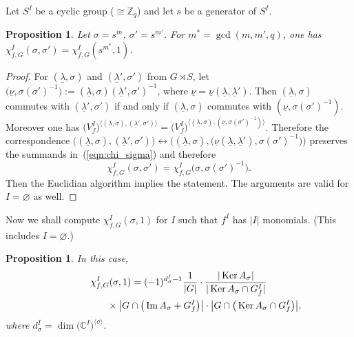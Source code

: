 \documentclass[pdftex]{sigma}
\numberwithin{equation}{section}
\newtheorem{Proposition}[Theorem]{Proposition}
 { \theoremstyle{definition}
\newtheorem{Definition}[Theorem]{Definition}
\newtheorem{Remark}[Theorem]{Remark} }
\begin{document}
Let $S^I$ be a cyclic group ($\cong {\mathbb Z}_q$) and let $s$ be a generator of $S^I$.

\begin{Proposition} \label{prop:red}
 Let $\sigma=s^m$, $\sigma'=s^{m'}$. For $m^*=\gcd(m, m', q)$, one has
 $\chi_{f,G}^I(\sigma, \sigma')=\chi_{f,G}^I(s^{m^*}, 1)$.
\end{Proposition}

\begin{proof}
 For $(\underline{\lambda},\sigma)$ and $(\underline{\lambda}',\sigma')$ from $G \rtimes S$, let
 $\big(\underline{\nu},\sigma(\sigma')^{-1}\big):=(\underline{\lambda},\sigma)(\underline{\lambda}',\sigma')^{-1}$,
 where $\underline{\nu}=\underline{\nu}(\underline{\lambda},\underline{\lambda}')$. Then
 $(\underline{\lambda},\sigma)$ commutes with $(\underline{\lambda}',\sigma')$ if and only if
 $(\underline{\lambda},\sigma)$ commutes with $(\underline{\nu},\sigma(\sigma')^{-1})$.
 Moreover one has
 $\big(V_f^I\big)^{\langle(\underline{\lambda},\sigma),(\underline{\lambda}',\sigma')\rangle}=
 \big(V_f^I\big)^{\langle(\underline{\lambda},\sigma),(\underline{\nu},\sigma(\sigma')^{-1})\rangle}$.
 Therefore the correspondence
 $\big((\underline{\lambda},\sigma),(\underline{\lambda}',\sigma')\big)\longleftrightarrow
 \big((\underline{\lambda},\sigma),
 \big(\underline{\nu}(\underline{\lambda},\underline{\lambda}'),\sigma(\sigma')^{-1}\big)\big)
 $
 preserves the summands in~(\ref{eqn:chi_sigma}) and therefore
 \[
 \chi_{f,G}^I(\sigma,\sigma')=\chi_{f,G}^I\big(\sigma,\sigma(\sigma')^{-1}\big).
 \]
Then the Euclidian algorithm implies the statement. The arguments are valid for $I=\varnothing$ as well.
\end{proof}

Now we shall compute $\chi_{f,G}^I(\sigma, 1)$ for $I$ such that $f^I$ has $\vert I\vert$ monomials.
(This includes $I=\varnothing$.)

\begin{Proposition} \label{prop:chisigma1}
 In this case,
 \begin{gather}
 \chi_{f,G}^I(\sigma, 1)= (-1)^{d^I_\sigma-1}\frac{1}{\vert G\vert}\cdot
 \frac{\vert \operatorname{Ker}A_{\sigma}\vert}{\vert \operatorname{Ker}A_{\sigma}\cap G^I_f\vert}\nonumber\\
 \hphantom{\chi_{f,G}^I(\sigma, 1)=}{}\times \big\vert G\cap\big(\operatorname{Im}A_{\sigma}+G_f^I\big)\big\vert\cdot\big\vert G\cap\big(\operatorname{Ker}A_{\sigma}\cap G_f^I\big)\big\vert,\label{eqn:chisigma1}
 \end{gather}
 where $d^I_\sigma= \dim\big({\mathbb C}^I\big)^{\langle \sigma \rangle}$.
\end{Proposition}
\end{document}
